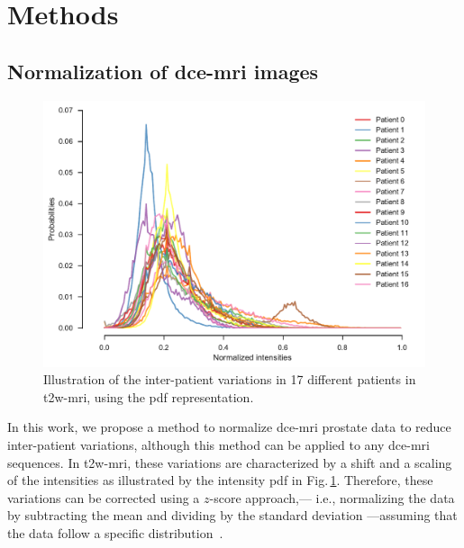 \section{Methods}\label{sec:method}

\subsection{Normalization of \ac{dce}-\ac{mri} images}\label{sec:norm}

\begin{figure}
  \centering
  \includegraphics[width=0.7\linewidth]{02_methods/figures/t2w.pdf}
  \caption{Illustration of the inter-patient variations in 17
    different patients in \acs*{t2w}-\acs*{mri}, using the \acs*{pdf} representation.}
  \label{fig:t2w}
\end{figure}

In this work, we propose a method to normalize \ac{dce}-\ac{mri}
prostate data to reduce inter-patient variations, although this method can be applied to any \ac{dce}-\ac{mri} sequences.
In \ac{t2w}-\ac{mri}, these variations are characterized by a shift and a scaling of the intensities as illustrated by the intensity \ac{pdf} in Fig.\,\ref{fig:t2w}.
Therefore, these variations can be corrected using a $z$-score approach,--- i.e., normalizing the data by subtracting the mean and dividing by the standard deviation ---assuming that the data follow a specific distribution~\citep{lemaitre2016normalization}.

